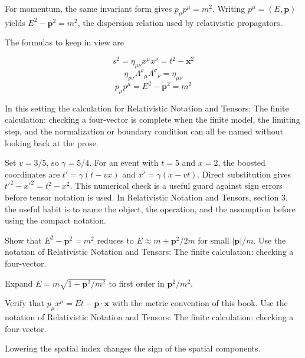 For momentum, the same invariant form gives \(p_\mu p^\mu=m^2\).  Writing \(p^\mu=(E,\bm p)\) yields \(E^2-\bm p^2=m^2\), the dispersion relation used by relativistic propagators.

The formulas to keep in view are

\[
  s^2=\eta_{\mu\nu}x^\mu x^\nu=t^2-\bm x^2
\]
\[
  \eta_{\rho\sigma}\Lambda^\rho{}_\mu\Lambda^\sigma{}_\nu=\eta_{\mu\nu}
\]
\[
  p_\mu p^\mu=E^2-\bm p^2=m^2
\]

In this setting the calculation for Relativistic Notation and Tensors: The finite calculation: checking a four-vector is complete when the finite model, the limiting step, and the normalization or boundary condition can all be named without looking back at the prose.




\begin{example}
Set \(v=3/5\), so \(\gamma=5/4\).  For an event with \(t=5\) and \(x=2\), the boosted coordinates are \(t'=\gamma(t-vx)\) and \(x'=\gamma(x-vt)\).  Direct substitution gives \(t'^2-x'^2=t^2-x^2\).  This numerical check is a useful guard against sign errors before tensor notation is used.  In Relativistic Notation and Tensors, section 3, the useful habit is to name the object, the operation, and the assumption before using the compact notation.
\end{example}



\begin{exercise}
Show that \(E^2-\bm p^2=m^2\) reduces to \(E\approx m+\bm p^2/2m\) for small \(|\bm p|/m\).  Use the notation of Relativistic Notation and Tensors: The finite calculation: checking a four-vector.
\begin{answer}
Expand \(E=m\sqrt{1+\bm p^2/m^2}\) to first order in \(\bm p^2/m^2\).
\end{answer}
\end{exercise}

\begin{exercise}
Verify that \(p_\mu x^\mu=Et-\bm p\cdot\bm x\) with the metric convention of this book.  Use the notation of Relativistic Notation and Tensors: The finite calculation: checking a four-vector.
\begin{answer}
Lowering the spatial index changes the sign of the spatial components.
\end{answer}
\end{exercise}



